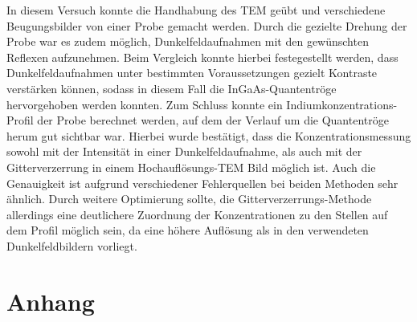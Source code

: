 \documentclass[a4paper,11pt,DIV=11]{scrartcl}
\begin{document}
In diesem Versuch konnte die Handhabung des TEM geübt und verschiedene Beugungsbilder von einer Probe gemacht werden. Durch die gezielte Drehung der Probe war es zudem möglich, Dunkelfeldaufnahmen mit den gewünschten Reflexen aufzunehmen. Beim Vergleich konnte hierbei festegestellt werden, dass Dunkelfeldaufnahmen unter bestimmten Voraussetzungen gezielt Kontraste verstärken können, sodass in diesem Fall die InGaAs-Quantentröge hervorgehoben werden konnten.
Zum Schluss konnte ein Indiumkonzentrations-Profil der Probe berechnet werden, auf dem der Verlauf um die Quantentröge herum gut sichtbar war. Hierbei wurde bestätigt, dass die Konzentrationsmessung sowohl mit der Intensität in einer Dunkelfeldaufnahme, als auch mit der Gitterverzerrung in einem Hochauflösungs-TEM Bild möglich ist. Auch die Genauigkeit ist aufgrund verschiedener Fehlerquellen bei beiden Methoden sehr ähnlich. Durch weitere Optimierung sollte, die Gitterverzerrungs-Methode allerdings eine deutlichere Zuordnung der Konzentrationen zu den Stellen auf dem Profil möglich sein, da eine höhere Auflösung als in den verwendeten Dunkelfeldbildern vorliegt.

\section*{Anhang}
\end{document}
